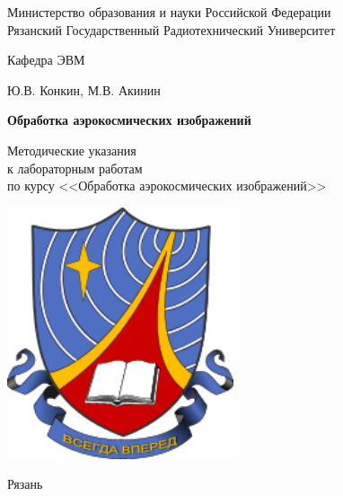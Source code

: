 
\begin{titlepage}

\begin{center}

Министерство образования и науки Российской Федерации \\
Рязанский Государственный Радиотехнический Университет

\bigskip

Кафедра ЭВМ

\vspace{5em}

Ю.В. Конкин, М.В. Акинин

\vspace{3em}

{\Large \bf Обработка аэрокосмических изображений}

\vspace{3em}

Методические указания\\
к лабораторным работам\\
по курсу <<Обработка аэрокосмических изображений>>

\vfill

\includegraphics[width=0.5\textwidth]{image/title.png}

\vfill

Рязань \the\year

\end{center}

\thispagestyle{empty}

\end{titlepage}

\setcounter{page}{2}

\newpage

